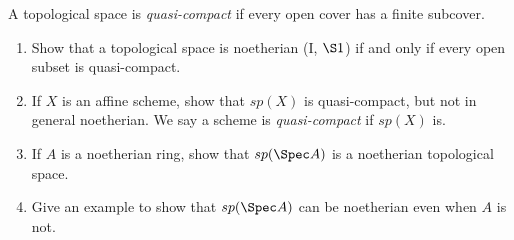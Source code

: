 \begin{exercise}
	A topological space is \textit{quasi-compact} if every open cover has a finite subcover.
	\begin{enumerate}
		\item Show that a topological space is noetherian (I, $\S 1 $) if and only if every open subset is quasi-compact.
		\item If $X $ is an affine scheme, show that $sp(X) $ is quasi-compact, but not in general noetherian. We say a scheme is \textit{quasi-compact} if $sp(X) $ is.
		\item If $A $ is a noetherian ring, show that $sp(\Spec A) $ is a noetherian topological space.
		\item Give an example to show that $sp(\Spec A) $ can be noetherian even when $A $ is not.
	\end{enumerate}
\end{exercise}
